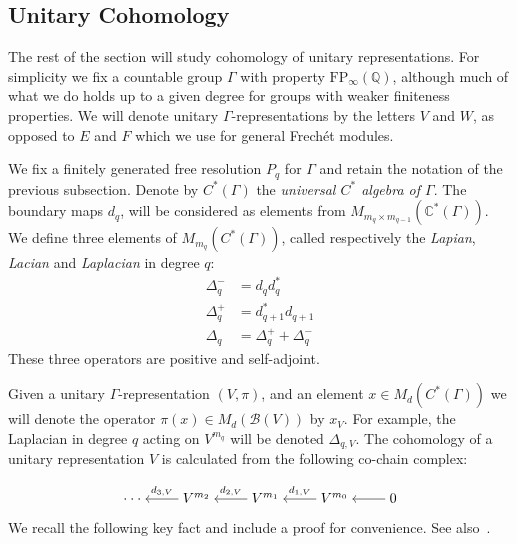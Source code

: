 \documentclass[12pt,reqno]{amsart}
\newcommand{\C}{\mathbb{C}}
\theoremstyle{definition}
\begin{document}
\subsection{Unitary Cohomology}
The rest of the section will study cohomology of unitary representations. For simplicity we fix a countable group $\Gamma$ with property $\mathrm{FP}_\infty(\mathbb{Q})$, although much of what we do holds up to a given degree for groups with weaker finiteness properties. We will denote unitary $\Gamma$-representations by the letters $V$ and $W$, as opposed to $E$ and $F$ which we use for general Frech\'et modules.

We fix a finitely generated free resolution $P_q$ for $\Gamma$ and retain the notation of the previous subsection.  Denote by $C^*(\Gamma)$ the \emph{universal $C^*$ algebra of $\Gamma$}. The boundary maps $d_q$, will be considered as elements from $M_{m_{q} \times m_{q-1}}(\C^*(\Gamma))$.  We define three elements of $M_{m_q}(C^*(\Gamma))$, called respectively the \emph{Lapian}, \emph{Lacian} and \emph{Laplacian} in degree $q$:
\begin{align*}
\Delta_{q}^- &= d_{q}d_{q}^*\\
\Delta_{q}^+ &= d_{q+1}^*d_{q+1}\\
\Delta_{q} &= \Delta_{q}^+ + \Delta_{q}^-
\end{align*}
These three operators are positive and self-adjoint.

Given a unitary $\Gamma$-representation $(V,\pi)$, and an element $x \in M_d(C^*(\Gamma))$ we will denote the operator $\pi(x) \in M_d(\mathcal{B}(V))$ by $x_V$. For example, the Laplacian in degree $q$ acting on $V^{m_q}$ will be denoted $\Delta_{q,V}$.
The cohomology of a unitary representation $V$ is calculated from the following co-chain complex:

\[\begin{tikzcd}[cramped]
	{\cdot \cdot \cdot} & {V^{m_2}} & {V^{m_1}} & {V^{m_0}} & 0
	\arrow["{d_{3,V}}"', from=1-2, to=1-1]
	\arrow["{d_{2,V}}"', from=1-3, to=1-2]
	\arrow["{d_{1,V}}"', from=1-4, to=1-3]
	\arrow[from=1-5, to=1-4]
\end{tikzcd}\]
We recall the following key fact and include a proof for convenience. See also~\cite[Lemma~1.18 on p.~25]{LuckBook}.
\end{document}
